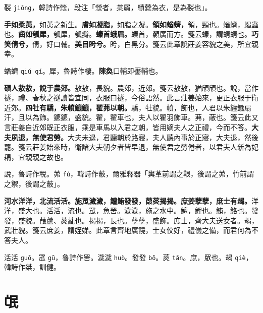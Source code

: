 \begin{quoting}褧 \texttt{jiǒng}，韓詩作檾，段注「檾者，枲屬，績檾為衣，是為褧也」。\end{quoting}

\textbf{手如柔荑，}{\footnotesize 如荑之新生。}\textbf{膚如凝脂，}{\footnotesize 如脂之凝。}\textbf{領如蝤蠐，}{\footnotesize 領，頸也。蝤蠐，蝎蟲也。}\textbf{齒如瓠犀，}{\footnotesize 瓠犀，瓠瓣。}\textbf{螓首蛾眉。}{\footnotesize 螓首，顙廣而方。箋云螓，謂蜻蜻也。}\textbf{巧笑倩兮，}{\footnotesize 倩，好口輔。}\textbf{美目盻兮。}{\footnotesize 盻，白黑分。箋云此章說莊姜容貌之美，所宜親幸。}

\begin{quoting}蝤蠐 \texttt{qiú qí}。犀，魯詩作棲。\textbf{陳奐}口輔即靨輔也。\end{quoting}

\textbf{碩人敖敖，說于農郊。}{\footnotesize 敖敖，長貌。農郊，近郊。箋云敖敖，猶頎頎也。說，當作禭，禮、春秋之禭讀皆宜同，衣服曰禭，今俗語然。此言莊姜始來，更正衣服于衛近郊。}\textbf{四牡有驕，朱幩鑣鑣，翟茀以朝。}{\footnotesize 驕，牡貌。幩，飾也，人君以朱纏鑣扇汗，且以為飾。鑣鑣，盛貌。翟，翟車也，夫人以翟羽飾車。茀，蔽也。箋云此又言莊姜自近郊既正衣服，乘是車馬以入君之朝，皆用嫡夫人之正禮，今而不答。}\textbf{大夫夙退，無使君勞。}{\footnotesize 大夫未退，君聽朝於路寢，夫人聽內事於正寢，大夫退，然後罷。箋云莊姜始來時，衛諸大夫朝夕者皆早退，無使君之勞倦者，以君夫人新為妃耦，宜親親之故也。}

\begin{quoting}說，魯詩作稅。茀 \texttt{fú}，韓詩作蔽，爾雅釋器「輿革前謂之鞎，後謂之茀，竹前謂之禦，後謂之蔽」。\end{quoting}

\textbf{河水洋洋，北流活活。施罛濊濊，鱣鮪發發，葭菼揭揭。庶姜孽孽，庶士有朅。}{\footnotesize 洋洋，盛大也。活活，流也。罛，魚罟。濊濊，施之水中。鱣，鯉也。鮪，鮥也。發發，盛貌。葭蘆、菼薍也。揭揭，長也。孽孽，盛飾。庶士，齊大夫送女者。朅，武壯貌。箋云庶姜，謂姪娣。此章言齊地廣饒，士女佼好，禮儀之備，而君何為不答夫人。}

\begin{quoting}活活 \texttt{guō}。罛 \texttt{gū}，魯詩作罟。濊濊 \texttt{huò}。發發 \texttt{bō}。菼 \texttt{tǎn}。庶，眾也。朅 \texttt{qiè}，韓詩作桀，訓健。\end{quoting}

\section{氓}

